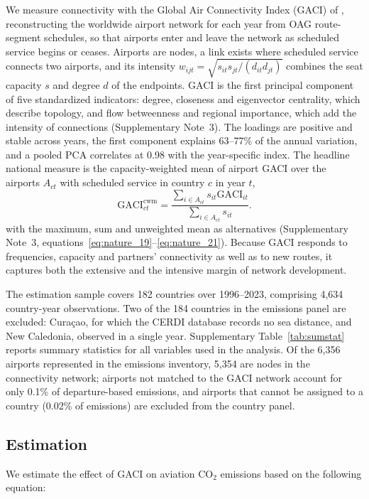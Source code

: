 \documentclass[12pt]{extarticle}
\begin{document}
We measure connectivity with the Global Air Connectivity Index (GACI) of \citet{cheung2020}, reconstructing the worldwide airport network for each year from OAG route-segment schedules, so that airports enter and leave the network as scheduled service begins or ceases. Airports are nodes, a link exists where scheduled service connects two airports, and its intensity $w_{ijt}=\sqrt{s_{it}s_{jt}/(d_{it}d_{jt})}$ combines the seat capacity $s$ and degree $d$ of the endpoints. GACI is the first principal component of five standardized indicators: degree, closeness and eigenvector centrality, which describe topology, and flow betweenness and regional importance, which add the intensity of connections (Supplementary Note~3). The loadings are positive and stable across years, the first component explains 63--77\% of the annual variation, and a pooled PCA correlates at 0.98 with the year-specific index. The headline national measure is the capacity-weighted mean of airport GACI over the airports $A_{ct}$ with scheduled service in country $c$ in year $t$,
\begin{equation}
\mathrm{GACI}^{\mathrm{cwm}}_{ct}
=
\frac{
\displaystyle
\sum_{i\in A_{ct}}
s_{it}\mathrm{GACI}_{it}
}{
\displaystyle
\sum_{i\in A_{ct}}
s_{it}
}.
\label{eq:nature_18}
\end{equation}
with the maximum, sum and unweighted mean as alternatives (Supplementary Note~3, equations~\ref{eq:nature_19}--\ref{eq:nature_21}). Because GACI responds to frequencies, capacity and partners' connectivity as well as to new routes, it captures both the extensive and the intensive margin of network development.

The estimation sample covers 182 countries over 1996--2023, comprising 4,634 country-year observations. Two of the 184 countries in the emissions panel are excluded: Cura\c{c}ao, for which the CERDI database records no sea distance, and New Caledonia, observed in a single year. Supplementary Table~\ref{tab:sumstat} reports summary statistics for all variables used in the analysis. Of the 6,356 airports represented in the emissions inventory, 5,354 are nodes in the connectivity network; airports not matched to the GACI network account for only 0.1\% of departure-based emissions, and airports that cannot be assigned to a country (0.02\% of emissions) are excluded from the country panel.

\subsection*{Estimation}
We estimate the effect of GACI on aviation CO$_2$ emissions based on the following equation:
\end{document}
